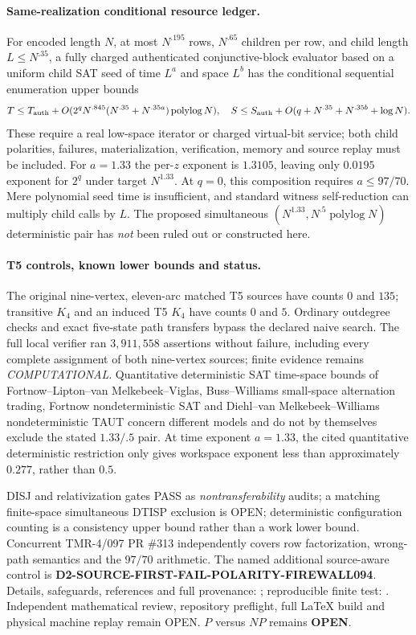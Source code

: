 \documentclass[11pt]{article}
\begin{document}
\paragraph{Same-realization conditional resource ledger.}
For encoded length $N$, at most $N^{.195}$ rows,
$N^{.65}$ children per row, and child length
$L\le N^{.35}$, a fully charged authenticated
conjunctive-block evaluator based on a uniform
child SAT seed of time $L^a$ and space $L^b$ has
the conditional sequential enumeration upper bounds
\[
 T\le T_{\rm auth}
 +O(2^q N^{.845}(N^{.35}+N^{.35a})
         \operatorname{polylog}N),\quad
 S\le S_{\rm auth}
 +O(q+N^{.35}+N^{.35b}+\log N).
\]
These require a real low-space iterator or charged
virtual-bit service; both child polarities, failures,
materialization, verification, memory and source replay
must be included.  For $a=1.33$ the per-$z$ exponent
is $1.3105$, leaving only $0.0195$ exponent for $2^q$
under target $N^{1.33}$.  At $q=0$, this composition
requires $a\le97/70$.  Mere polynomial seed time
is insufficient, and standard witness self-reduction
can multiply child calls by $L$.
The proposed simultaneous
$(N^{1.33},N^{.5}\operatorname{polylog}N)$ deterministic
pair has \emph{not} been ruled out or constructed here.

\paragraph{T5 controls, known lower bounds and status.}
The original nine-vertex, eleven-arc matched T5 sources
have counts $0$ and $135$; transitive $K_4$ and an
induced T5 $K_4$ have counts $0$ and $5$.
Ordinary outdegree checks and exact five-state
path transfers bypass the declared naive search.
The full local verifier ran $3{,}911{,}558$
assertions without failure, including every
complete assignment of both nine-vertex sources;
finite evidence remains \emph{COMPUTATIONAL}.
Quantitative deterministic SAT time-space bounds
of Fortnow--Lipton--van Melkebeek--Viglas,
Buss--Williams small-space alternation trading,
Fortnow nondeterministic SAT and
Diehl--van Melkebeek--Williams nondeterministic TAUT
concern different models and do not by themselves
exclude the stated $1.33/.5$ pair.
At time exponent $a=1.33$, the cited quantitative
deterministic restriction only gives workspace
exponent less than approximately $0.277$,
rather than $0.5$.

DISJ and relativization gates PASS as
\emph{nontransferability} audits; a matching
finite-space simultaneous DTISP exclusion is OPEN;
deterministic configuration counting is a consistency
upper bound rather than a work lower bound.
Concurrent TMR-4/097 PR \#313 independently covers
row factorization, wrong-path semantics and the
$97/70$ arithmetic.  The named additional
source-aware control is
\textbf{D2-SOURCE-FIRST-FAIL-POLARITY-FIREWALL094}.
Details, safeguards, references and full provenance:
;
reproducible finite test:
.
Independent mathematical review, repository preflight,
full \LaTeX{} build and physical machine replay remain OPEN.
$P$ versus $NP$ remains \textbf{OPEN}.
\end{document}
